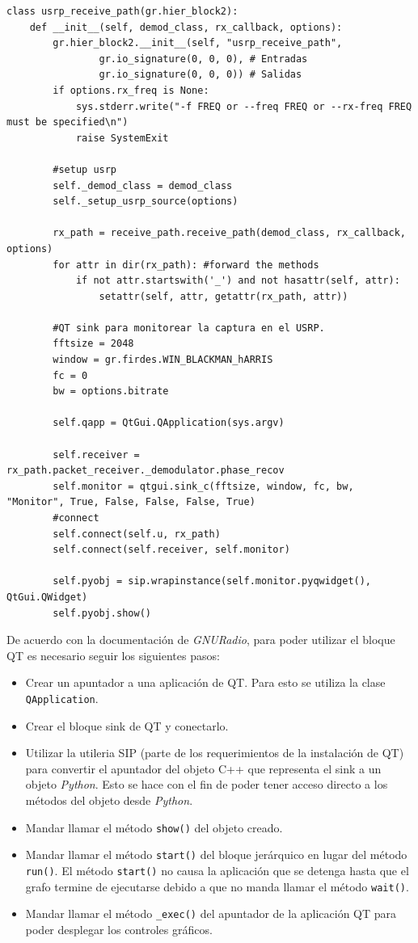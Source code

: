 \begin{lstlisting}[float, label=ex:qtsink, caption={Modificaci\'on del programa \emph{benchmark} para
desplegar el bloque gr\'afico de QT.}, breaklines=true] 
class usrp_receive_path(gr.hier_block2):
    def __init__(self, demod_class, rx_callback, options):
        gr.hier_block2.__init__(self, "usrp_receive_path",
                gr.io_signature(0, 0, 0), # Entradas
                gr.io_signature(0, 0, 0)) # Salidas
        if options.rx_freq is None:
            sys.stderr.write("-f FREQ or --freq FREQ or --rx-freq FREQ must be specified\n")
            raise SystemExit

        #setup usrp
        self._demod_class = demod_class
        self._setup_usrp_source(options)

        rx_path = receive_path.receive_path(demod_class, rx_callback, options)
        for attr in dir(rx_path): #forward the methods
            if not attr.startswith('_') and not hasattr(self, attr):
                setattr(self, attr, getattr(rx_path, attr))

        #QT sink para monitorear la captura en el USRP.
        fftsize = 2048
        window = gr.firdes.WIN_BLACKMAN_hARRIS
        fc = 0
        bw = options.bitrate

        self.qapp = QtGui.QApplication(sys.argv)

        self.receiver = rx_path.packet_receiver._demodulator.phase_recov
        self.monitor = qtgui.sink_c(fftsize, window, fc, bw, "Monitor", True, False, False, False, True)
        #connect
        self.connect(self.u, rx_path)
        self.connect(self.receiver, self.monitor)

        self.pyobj = sip.wrapinstance(self.monitor.pyqwidget(), QtGui.QWidget)
        self.pyobj.show()
\end{lstlisting}

De acuerdo con la documentaci\'on de \emph{GNURadio}, para poder utilizar el bloque QT es necesario seguir
los siguientes pasos:
\begin{itemize}
  \item Crear un apuntador a una aplicaci\'on de QT. Para esto se utiliza la clase
  \verb|QApplication|.
  \item Crear el bloque sink de QT y conectarlo.
  \item Utilizar la utileria SIP (parte de los requerimientos de la instalaci\'on de QT) para
  convertir el apuntador del objeto C++ que representa el sink a un objeto \emph{Python}. Esto se hace con
  el fin de poder tener acceso directo a los m\'etodos del objeto desde \emph{Python}.
  \item Mandar llamar el m\'etodo \verb|show()| del objeto creado.
  \item Mandar llamar el m\'etodo \verb|start()| del bloque jer\'arquico en lugar del m\'etodo
  \verb|run()|. El m\'etodo \verb|start()| no causa la aplicaci\'on que se detenga hasta que el grafo
  termine de ejecutarse debido a que no manda llamar el m\'etodo \verb|wait()|.
  \item Mandar llamar el m\'etodo \verb|_exec()| del apuntador de la aplicaci\'on QT para poder desplegar
  los controles gr\'aficos. 
\end{itemize}

